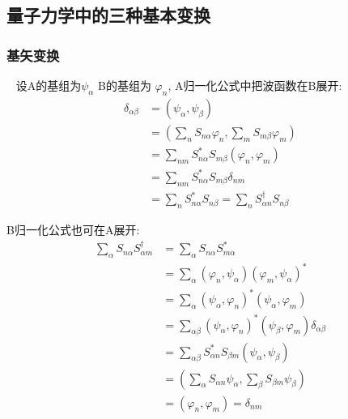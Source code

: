 \subsection{量子力学中的三种基本变换}

\begin{frame} 
    \frametitle{基矢变换}
    \例[2.试证明量子力学不同表象基组之间的变换是幺正变换]{}  
    \证~ 设A的基组为$\psi_\alpha$ B的基组为 $\varphi_n$, A归一化公式中把波函数在B展开: 
    \begin{equation*}
        \begin{split}
            \delta_{\alpha\beta} &= (\psi_\alpha, \psi_\beta) \\
            &= (\sum_n S_{n\alpha} \varphi_n, \sum_m S_{m\beta} \varphi_m)\\
            &= \sum_{nm} S_{n\alpha} ^* S_{m\beta}(\varphi_n, \varphi_m)\\
            &= \sum_{nm} S_{n\alpha} ^* S_{m\beta}\delta_{nm}\\
            &= \sum_{n} S_{n\alpha} ^* S_{n\beta} = \sum_{n} S^{\dagger } _{\alpha n} S_{n\beta}
        \end{split} 
    \end{equation*}
\end{frame}

\begin{frame} 
    B归一化公式也可在A展开: 
    \begin{equation*}
        \begin{split}
            \sum_{\alpha} S_{n\alpha}  S^{\dagger } _{\alpha m}&=\sum_{\alpha} S_{n\alpha}  S_{m \alpha} ^* \\
            &=\sum_{\alpha} (\varphi_n, \psi_\alpha) (\varphi_m, \psi_\alpha)^* \\
            &=\sum_{\alpha} (\psi_\alpha,\varphi_n)^* (\psi_\alpha,\varphi_m) \\
            &=\sum_{\alpha\beta} (\psi_\alpha,\varphi_n)^* (\psi_\beta,\varphi_m) \delta_{\alpha\beta} \\
            &=\sum_{\alpha\beta} S_{\alpha n}^*  S_{\beta m} (\psi_\alpha,\psi_\beta)\\
            &= (\sum_{\alpha} S_{\alpha n}\psi_\alpha,\sum_{\beta} S_{\beta m}\psi_\beta)\\
            &= (\varphi_n,\varphi_m) =\delta_{nm} 
        \end{split} 
    \end{equation*}
\end{frame}

